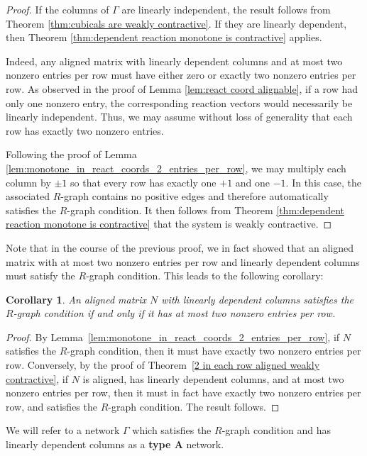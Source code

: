 \documentclass{article}
\newtheorem{cor}{Corollary}
\begin{document}
\begin{proof}
If the columns of \( \Gamma \) are linearly independent, the result follows from Theorem \ref{thm:cubicals are weakly contractive}. If they are linearly dependent, then Theorem \ref{thm:dependent reaction monotone is contractive} applies.

Indeed, any aligned matrix with linearly dependent columns and at most two nonzero entries per row must have either zero or exactly two nonzero entries per row. As observed in the proof of Lemma \ref{lem:react coord alignable}, if a row had only one nonzero entry, the corresponding reaction vectors would necessarily be linearly independent. Thus, we may assume without loss of generality that each row has exactly two nonzero entries.

Following the proof of Lemma \ref{lem:monotone_in_react_coords_2_entries_per_row}, we may multiply each column by \( \pm 1 \) so that every row has exactly one \( +1 \) and one \( -1 \). In this case, the associated \( R \)-graph contains no positive edges and therefore automatically satisfies the \( R \)-graph condition. It then follows from Theorem \ref{thm:dependent reaction monotone is contractive} that the system is weakly contractive.
\end{proof}

Note that in the course of the previous proof, we in fact showed that an aligned matrix with at most two nonzero entries per row and linearly dependent columns must satisfy the \( R \)-graph condition. This leads to the following corollary:

\begin{cor}
\label{cor:2 entries per row iff r graph}
An aligned matrix \( N \) with linearly dependent columns satisfies the \( R \)-graph condition if and only if it has at most two nonzero entries per row.
\end{cor}

\begin{proof}
By Lemma~\ref{lem:monotone_in_react_coords_2_entries_per_row}, if \( N \) satisfies the \( R \)-graph condition, then it must have exactly two nonzero entries per row. Conversely, by the proof of Theorem~\ref{2 in each row aligned weakly contractive}, if \( N \) is aligned, has linearly dependent columns, and at most two nonzero entries per row, then it must in fact have exactly two nonzero entries per row, and satisfies the \( R \)-graph condition. The result follows.
\end{proof}

We will refer to a network $\Gamma$ which satisfies the $R$-graph condition and has linearly dependent columns as a \textbf{type A} network. 
\end{document}
